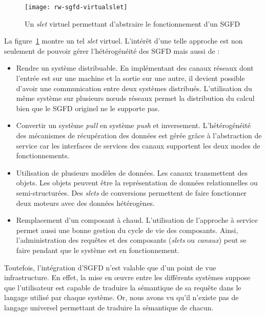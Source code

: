 \begin{figure}[ht]
    \centering
    \texttt{[image: rw-sgfd-virtualslet]}
    \caption{Un \textit{slet} virtuel permettant d'abstraire le fonctionnement d'un SGFD}\label{fig:rw:sgfd:virtualslet}
\end{figure}
La figure~\ref{fig:rw:sgfd:virtualslet} montre un tel \textit{slet} virtuel. L'intérêt d'une telle approche est non seulement de pouvoir gérer l'hétérogénéité des SGFD mais aussi de :
\begin{itemize}
	\item Rendre un système distribuable. En implémentant des canaux réseaux dont l'entrée est sur une machine et la sortie sur une autre, il devient possible d'avoir une communication entre deux systèmes distribués. L'utilisation du même système sur plusieurs nœuds réseaux permet la distribution du calcul bien que le SGFD originel ne le supporte pas.
	\item Convertir un système \textit{pull} en système \textit{push} et inversement. L'hétérogénéité des mécanismes de récupération des données est gérée grâce à l'abstraction de service car les interfaces de services des canaux supportent les deux modes de fonctionnements.
	\item Utilisation de plusieurs modèles de données. Les canaux transmettent des objets. Les objets peuvent être la représentation de données relationnelles ou semi-structurées. Des \textit{slets} de conversions permettent de faire fonctionner deux moteurs avec des données hétérogènes.
	\item Remplacement d'un composant à chaud. L'utilisation de l'approche à service permet aussi une bonne gestion du cycle de vie des composants. Ainsi, l'administration des requêtes et des composants (\textit{slets} ou \textit{canaux}) peut se faire pendant que le système est en fonctionnement.
\end{itemize}

Toutefois, l'intégration d'SGFD n'est valable que d'un point de vue infrastructure. En effet, la mise en œuvre entre les différents systèmes suppose que l'utilisateur est capable de traduire la sémantique de sa requête dans le langage utilisé par chaque système. Or, nous avons vu qu'il n'existe pas de langage universel permettant de traduire la sémantique de chacun.
